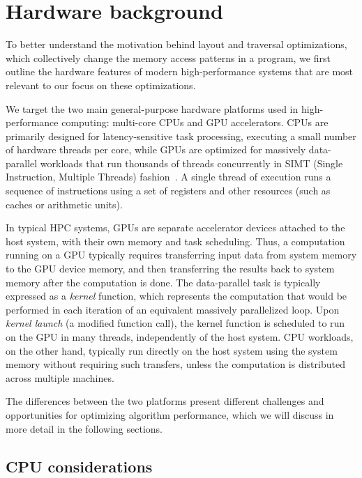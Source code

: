 \chapter{Hardware background}\label{chap:background}

To better understand the motivation behind layout and traversal optimizations, which collectively change the memory access patterns in a program, we first outline the hardware features of modern high-performance systems that are most relevant to our focus on these optimizations.

We target the two main general-purpose hardware platforms used in high-performance computing: multi-core CPUs and GPU accelerators.
CPUs are primarily designed for latency-sensitive task processing, executing a small number of hardware threads per core, while GPUs are optimized for massively data-parallel workloads that run thousands of threads concurrently in SIMT (Single Instruction, Multiple Threads) fashion~\cite{hennessy2019computer,cuda_programming_guide}. A single thread of execution runs a sequence of instructions using a set of registers and other resources (such as caches or arithmetic units).

In typical HPC systems, GPUs are separate accelerator devices attached to the host system, with their own memory and task scheduling. Thus, a computation running on a GPU typically requires transferring input data from system memory to the GPU device memory, and then transferring the results back to system memory after the computation is done. The data-parallel task is typically expressed as a \emph{kernel} function, which represents the computation that would be performed in each iteration of an equivalent massively parallelized loop. Upon \emph{kernel launch} (a modified function call), the kernel function is scheduled to run on the GPU in many threads, independently of the host system. CPU workloads, on the other hand, typically run directly on the host system using the system memory without requiring such transfers, unless the computation is distributed across multiple machines.

The differences between the two platforms present different challenges and opportunities for optimizing algorithm performance, which we will discuss in more detail in the following sections.


\section{CPU considerations}\label{sec:cpu-considerations}

